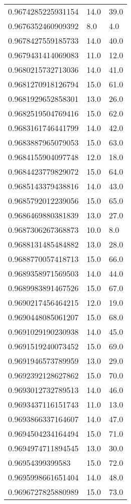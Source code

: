 \begin{center}
\begin{supertabular}[H]{p{0.30\textwidth}p{0.05\textwidth}p{0.05\textwidth}}
0.9674285225931154 & 14.0 & 39.0 \\ 
0.9676352460909392 & 8.0 & 4.0 \\ 
0.9678427559185733 & 14.0 & 40.0 \\ 
0.9679431414069083 & 11.0 & 12.0 \\ 
0.9680215732713036 & 14.0 & 41.0 \\ 
0.9681270918126794 & 15.0 & 61.0 \\ 
0.9681929652858301 & 13.0 & 26.0 \\ 
0.9682519504769416 & 15.0 & 62.0 \\ 
0.9683161746441799 & 14.0 & 42.0 \\ 
0.9683887965079053 & 15.0 & 63.0 \\ 
0.9684155904097748 & 12.0 & 18.0 \\ 
0.9684423779829072 & 15.0 & 64.0 \\ 
0.9685143379438816 & 14.0 & 43.0 \\ 
0.9685792012239056 & 15.0 & 65.0 \\ 
0.9686469880381839 & 13.0 & 27.0 \\ 
0.9687306267368873 & 10.0 & 8.0 \\ 
0.9688131485484882 & 13.0 & 28.0 \\ 
0.9688770057418713 & 15.0 & 66.0 \\ 
0.9689358971569503 & 14.0 & 44.0 \\ 
0.9689983891467526 & 15.0 & 67.0 \\ 
0.9690217456464215 & 12.0 & 19.0 \\ 
0.9690448085061207 & 15.0 & 68.0 \\ 
0.9691029190230938 & 14.0 & 45.0 \\ 
0.9691519240073452 & 15.0 & 69.0 \\ 
0.9691946573789959 & 13.0 & 29.0 \\ 
0.9692392128627862 & 15.0 & 70.0 \\ 
0.9693012732789513 & 14.0 & 46.0 \\ 
0.9693437116151743 & 11.0 & 13.0 \\ 
0.9693866337164607 & 14.0 & 47.0 \\ 
0.9694504234164494 & 15.0 & 71.0 \\ 
0.9694974711894545 & 13.0 & 30.0 \\ 
0.96954399399583 & 15.0 & 72.0 \\ 
0.9695998661651404 & 14.0 & 48.0 \\ 
0.9696727825880989 & 15.0 & 73.0 \\ 

\end{supertabular}
\end{center}
